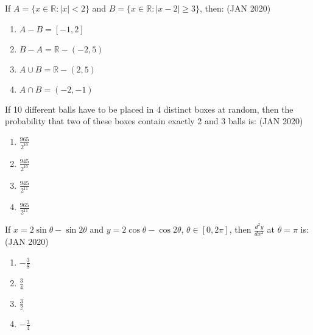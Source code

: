 \iffalse
   \title{Assignment}
   \author{EE24BTECH11034}
   \section{mcq-single}
\fi   
   

    \item If \( A = \{x \in \mathbb{R} : |x| < 2\} \) and \( B = \{x \in \mathbb{R} : |x - 2| \geq 3\} \), then: \hfill{(JAN 2020)}
        \begin{multicols}{4}
        
        \begin{enumerate}
            \item \( A - B = [-1, 2] \)  
            \item \( B - A = \mathbb{R} - (-2, 5) \)  
            \item \( A \cup B = \mathbb{R} - (2, 5) \)  
            \item \( A \cap B = (-2, -1) \)
        \end{enumerate}
        \end{multicols}

    \item If 10 different balls have to be placed in 4 distinct boxes at random, then the probability that two of these boxes contain exactly 2 and 3 balls is: \hfill{(JAN 2020)}
        \begin{multicols}{4}
        \begin{enumerate}
            \item \( \frac{965}{2^{10}} \)  
            \item \( \frac{945}{2^{10}} \)  
            \item \( \frac{945}{2^{11}} \)  
            \item \( \frac{965}{2^{11}} \)
        \end{enumerate}
        \end{multicols}

    \item If \( x = 2 \sin \theta - \sin 2 \theta \) and \( y = 2 \cos \theta - \cos 2 \theta \), \( \theta \in [0, 2\pi] \), then \( \frac{d^2y}{dx^2} \) at \( \theta = \pi \) is: \hfill{(JAN 2020)}
        \begin{multicols}{4}
        \begin{enumerate}
            \item \( -\frac{3}{8} \)  
            \item \( \frac{3}{4} \)  
            \item \( \frac{3}{2} \)  
            \item \( -\frac{3}{4} \)
        \end{enumerate}
        \end{multicols}

